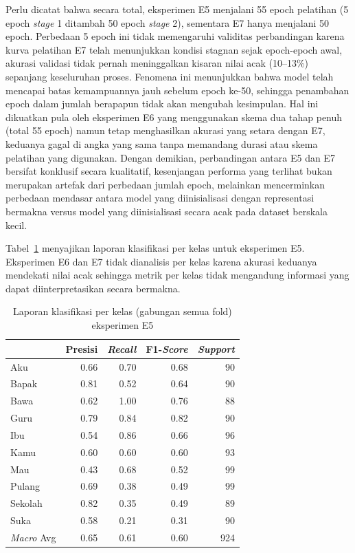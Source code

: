 Perlu dicatat bahwa secara total, eksperimen E5 menjalani 55 epoch pelatihan (5 epoch \textit{stage} 1 ditambah 50 epoch \textit{stage} 2), sementara E7 hanya menjalani 50 epoch. Perbedaan 5 epoch ini tidak memengaruhi validitas perbandingan karena kurva pelatihan E7 telah menunjukkan kondisi stagnan sejak epoch-epoch awal, akurasi validasi tidak pernah meninggalkan kisaran nilai acak (10--13\%) sepanjang keseluruhan proses. Fenomena ini menunjukkan bahwa model telah mencapai batas kemampuannya jauh sebelum epoch ke-50, sehingga penambahan epoch dalam jumlah berapapun tidak akan mengubah kesimpulan. Hal ini dikuatkan pula oleh eksperimen E6 yang menggunakan skema dua tahap penuh (total 55 epoch) namun tetap menghasilkan akurasi yang setara dengan E7, keduanya gagal di angka yang sama tanpa memandang durasi atau skema pelatihan yang digunakan. Dengan demikian, perbandingan antara E5 dan E7 bersifat konklusif secara kualitatif, kesenjangan performa yang terlihat bukan merupakan artefak dari perbedaan jumlah epoch, melainkan mencerminkan perbedaan mendasar antara model yang diinisialisasi dengan representasi bermakna versus model yang diinisialisasi secara acak pada dataset berskala kecil.\par

Tabel~\ref{tab:4.s2_perkelas} menyajikan laporan klasifikasi per kelas untuk eksperimen E5. Eksperimen E6 dan E7 tidak dianalisis per kelas karena akurasi keduanya mendekati nilai acak sehingga metrik per kelas tidak mengandung informasi yang dapat diinterpretasikan secara bermakna.\par

\begin{table}[H]
\centering
\caption{Laporan klasifikasi per kelas (gabungan semua fold) eksperimen E5}
\label{tab:4.s2_perkelas}
{\setlength{\tabcolsep}{3pt}
\footnotesize
\begin{tabular}{|l|r|r|r|r|}
\hline
\rowcolor{gray!15} \multicolumn{1}{|c|}{Kelas} & \multicolumn{1}{c|}{Presisi} & \multicolumn{1}{c|}{\textit{Recall}} & \multicolumn{1}{c|}{F1-\textit{Score}} & \multicolumn{1}{c|}{\textit{Support}} \\
\hline
Aku     & 0.66 & 0.70 & 0.68 & 90 \\
Bapak   & 0.81 & 0.52 & 0.64 & 90 \\
Bawa    & 0.62 & 1.00 & 0.76 & 88 \\
Guru    & 0.79 & 0.84 & 0.82 & 90 \\
Ibu     & 0.54 & 0.86 & 0.66 & 96 \\
Kamu    & 0.60 & 0.60 & 0.60 & 93 \\
Mau     & 0.43 & 0.68 & 0.52 & 99 \\
Pulang  & 0.69 & 0.38 & 0.49 & 99 \\
Sekolah & 0.82 & 0.35 & 0.49 & 89 \\
Suka    & 0.58 & 0.21 & 0.31 & 90 \\
\hline
\textit{Macro} Avg & 0.65 & 0.61 & 0.60 & 924 \\
\hline
\end{tabular}
}
\end{table}


